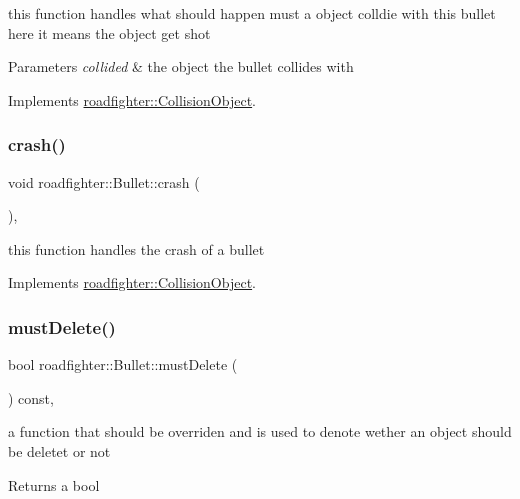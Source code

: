 this function handles what should happen must a object colldie with this bullet here it means the object get shot 
\begin{DoxyParams}{Parameters}
{\em collided} & the object the bullet collides with \\
\hline
\end{DoxyParams}


Implements \hyperlink{classroadfighter_1_1CollisionObject_a7eafa2fdc4463788b816fdd9370d28d9}{roadfighter\+::\+Collision\+Object}.

\mbox{\label{classroadfighter_1_1Bullet_ac96121377fffa9ed8ea94c333a841a7a}} 
\subsubsection{\texorpdfstring{crash()}{crash()}}
{\footnotesize\ttfamily void roadfighter\+::\+Bullet\+::crash (\begin{DoxyParamCaption}{ }\end{DoxyParamCaption})\hspace{0.3cm}{\ttfamily [override]}, {\ttfamily [virtual]}}

this function handles the crash of a bullet 

Implements \hyperlink{classroadfighter_1_1CollisionObject_a18f0f60a5a664d6fb554daac0d398a2c}{roadfighter\+::\+Collision\+Object}.

\mbox{\label{classroadfighter_1_1Bullet_a0f87b693a1583522e551ba1324fcd067}} 
\subsubsection{\texorpdfstring{must\+Delete()}{mustDelete()}}
{\footnotesize\ttfamily bool roadfighter\+::\+Bullet\+::must\+Delete (\begin{DoxyParamCaption}{ }\end{DoxyParamCaption}) const\hspace{0.3cm}{\ttfamily [override]}, {\ttfamily [virtual]}}

a function that should be overriden and is used to denote wether an object should be deletet or not \begin{DoxyReturn}{Returns}
a bool 
\end{DoxyReturn}


